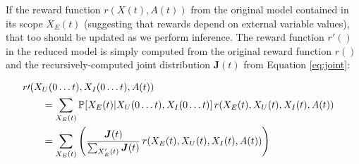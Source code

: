 \documentclass[10pt]{article}
\newcommand{\PP}[2][]{\mathbb{P\!}_{#1}\left[#2\right]}
\begin{document}
If the reward function $r(X(t),A(t))$ from the original model contained in its scope $X_{E}(t)$ (suggesting that rewards depend on external variable values), that too should be updated as we perform inference.  The reward function $r\prime()$ in the reduced model is simply computed from the original reward function $r()$ and the recursively-computed joint distribution $\boldsymbol{J}(t)$ from Equation \ref{eq:joint}:

{
\small
\begin{align}%
\nonumber%
\lefteqn{r\prime\!\left(X_{U}(0\ldots t),X_{I}(0\ldots t),A(t)\right)}\\
  \nonumber%
  &\qquad=\sum_{X_{E}(t)} \PP{X_{E}(t)|X_{U}(0\ldots t),X_{I}(0\ldots t)} r\!\left(X_{E}(t),X_{U}(t),X_{I}(t),A(t)\right)\\ 
  &\qquad=\sum_{X_{E}(t)}
  \left(
  \frac{
    \boldsymbol{J}(t)
  }{
    \sum_{X_{E}'(t)} \boldsymbol{J}(t)
  }
  \,r\!\left(X_{E}(t),X_{U}(t),X_{I}(t),A(t)\right)
  \right)
  \label{eq:induced-reward}
\end{align}
}

% 
% 
% 
\end{document}
